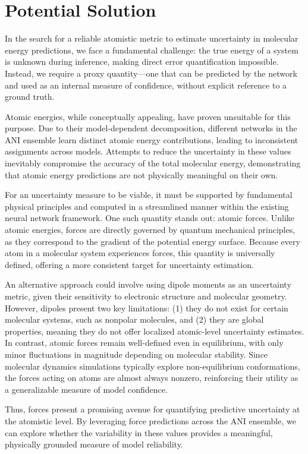 \section{Potential Solution}
\label{sec:uncertainty_potential_solution}
In the search for a reliable atomistic metric to estimate uncertainty in molecular energy predictions, we face a fundamental challenge: the true energy of a system is unknown during inference, making direct error quantification impossible. Instead, we require a proxy quantity—one that can be predicted by the network and used as an internal measure of confidence, without explicit reference to a ground truth.

Atomic energies, while conceptually appealing, have proven unsuitable for this purpose. Due to their model-dependent decomposition, different networks in the ANI ensemble learn distinct atomic energy contributions, leading to inconsistent assignments across models. Attempts to reduce the uncertainty in these values inevitably compromise the accuracy of the total molecular energy, demonstrating that atomic energy predictions are not physically meaningful on their own.

For an uncertainty measure to be viable, it must be supported by fundamental physical principles and computed in a streamlined manner within the existing neural network framework. One such quantity stands out: atomic forces. Unlike atomic energies, forces are directly governed by quantum mechanical principles, as they correspond to the gradient of the potential energy surface. Because every atom in a molecular system experiences forces, this quantity is universally defined, offering a more consistent target for uncertainty estimation.

An alternative approach could involve using dipole moments as an uncertainty metric, given their sensitivity to electronic structure and molecular geometry. However, dipoles present two key limitations: (1) they do not exist for certain molecular systems, such as nonpolar molecules, and (2) they are global properties, meaning they do not offer localized atomic-level uncertainty estimates. In contrast, atomic forces remain well-defined even in equilibrium, with only minor fluctuations in magnitude depending on molecular stability. Since molecular dynamics simulations typically explore non-equilibrium conformations, the forces acting on atoms are almost always nonzero, reinforcing their utility as a generalizable measure of model confidence.

Thus, forces present a promising avenue for quantifying predictive uncertainty at the atomistic level. By leveraging force predictions across the ANI ensemble, we can explore whether the variability in these values provides a meaningful, physically grounded measure of model reliability.


